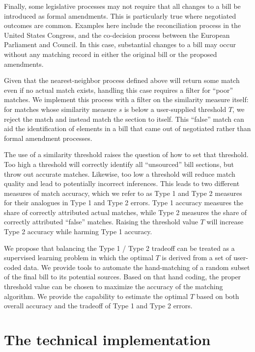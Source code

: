 \documentclass[11pt]{article}
\begin{document}
Finally, some legislative processes may not require that all changes
to a bill be introduced as formal amendments. This is particularly
true where negotiated outcomes are common. Examples here include the
reconciliation process in the United States Congress, and the
co-decision process between the European Parliament and Council. In
this case, substantial changes to a bill may occur without any
matching record in either the original bill or the proposed
amendments. 

Given that the nearest-neighbor process defined above will return some
match even if no actual match exists, handling this case requires a
filter for ``poor'' matches. We implement this process with a filter
on the similarity measure itself: for matches whose similarity
measure $s$ is below a user-supplied threshold $T$, we reject the
match and instead match the section to itself. This ``false'' match
can aid the identification of elements in a bill that
came out of negotiated rather than formal amendment processes. 

The use of a similarity threshold raises the question of how to set
that threshold. Too high a threshold will correctly identify all ``unsourced'' bill
sections, but throw out accurate matches. Likewise, too low a threshold
will reduce match quality and lead to potentially incorrect
inferences. This leads to two different measures of match accuracy,
which we refer to as Type 1 and Type 2 measures for their analogues in
Type 1 and Type 2 errors. Type 1 accuracy measures the share of
correctly attributed actual matches, while Type 2 measures the share
of correctly attributed ``false'' matches. Raising the threshold value
$T$ will increase Type 2 accuracy while harming Type 1
accuracy.  

We propose that balancing the Type 1 / Type 2 tradeoff can be treated
as a supervised learning problem
in which the optimal $T$ is derived from a set of user-coded data. We
provide tools to automate the hand-matching of a random subset of the
final bill to its potential sources. Based on that hand coding, the
proper threshold value can be chosen to maximize the accuracy of the
matching algorithm. We provide the capability to estimate the optimal
$T$ based on both overall accuracy and the tradeoff of Type 1 and Type
2 errors. 


\section{The technical implementation}
\label{sec:legisl-sect-match}
\end{document}
